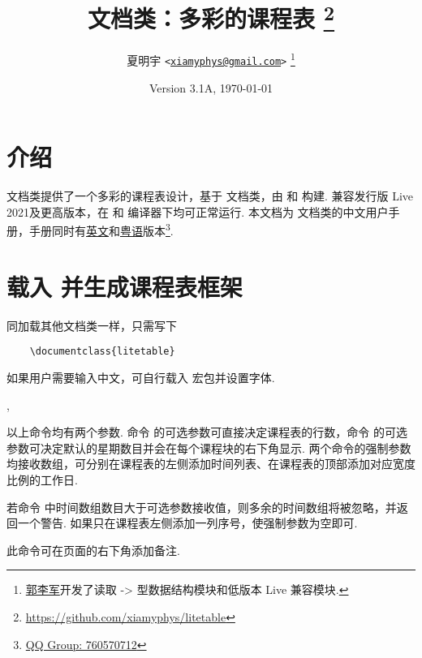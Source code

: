 \documentclass[letterpaper]{l3doc}
\title
{
  \bfseries\cls{litetable} 文档类：多彩的课程表
  \thanks{\url{https://github.com/xiamyphys/litetable}}
}
\author
{
  夏明宇 \texttt{<\href{mailto:xiamyphys@gmail.com}{xiamyphys@gmail.com}>}
  \thanks{\href{https://github.com/ljguo1020}{郭李军}开发了读取 \meta{left} -> \meta{right} 型数据结构模块和低版本 \hologo{TeX} Live 兼容模块.}
}
\date{Version 3.1A, \today}
\begin{document}
\maketitle

\section{介绍}

 文档类提供了一个多彩的课程表设计，基于  文档类，由  和  构建. 兼容发行版  Live 2021及更高版本，在  和  编译器下均可正常运行. 本文档为  文档类的中文用户手册，手册同时有\href{./litetable-en.pdf}{英文}和\href{./litetable-hk.pdf}{粤语}版本\footnote{\href{https://qm.qq.com/q/RyssAhG4qy}{QQ Group: 760570712}}.

\section{载入  并生成课程表框架}

同加载其他文档类一样，只需写下

\begin{framed}
  \begin{verbatim}
    \documentclass{litetable}
  \end{verbatim}
\end{framed}

如果用户需要输入中文，可自行载入  宏包并设置字体.

\begin{function}{\timelist,\weeklist}
  \begin{syntax}
                 
        
  \end{syntax}

  以上命令均有两个参数. 命令  的可选参数可直接决定课程表的行数，命令  的可选参数可决定默认的星期数目并会在每个课程块的右下角显示. 两个命令的强制参数均接收数组，可分别在课程表的左侧添加时间列表、在课程表的顶部添加对应宽度比例的工作日.

  若命令  中时间数组数目大于可选参数接收值，则多余的时间数组将被忽略，并返回一个警告. 如果只在课程表左侧添加一列序号，使强制参数为空即可.
\end{function}

\begin{function}{\more}
  \begin{syntax}
  \end{syntax}

  此命令可在页面的右下角添加备注.
\end{function}
\end{document}
